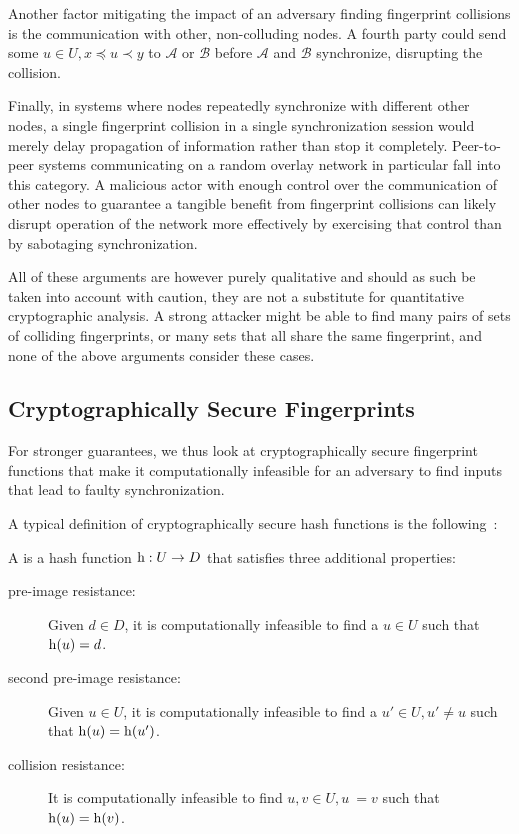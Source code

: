 \documentclass[conference]{IEEEtran}
\begin{document}
Another factor mitigating the impact of an adversary finding fingerprint collisions is the communication with other, non-colluding nodes. A fourth party could send some $u \in U, x \preceq u \prec y$ to $\mathcal{A}$ or $\mathcal{B}$ before $\mathcal{A}$ and $\mathcal{B}$ synchronize, disrupting the collision.

Finally, in systems where nodes repeatedly synchronize with different other nodes, a single fingerprint collision in a single synchronization session would merely delay propagation of information rather than stop it completely. Peer-to-peer systems communicating on a random overlay network in particular fall into this category. A malicious actor with enough control over the communication of other nodes to guarantee a tangible benefit from fingerprint collisions can likely disrupt operation of the network more effectively by exercising that control than by sabotaging synchronization.

All of these arguments are however purely qualitative and should as such be taken into account with caution, they are not a substitute for quantitative cryptographic analysis. A strong attacker might be able to find many pairs of sets of colliding fingerprints, or many sets that all share the same fingerprint, and none of the above arguments consider these cases.

\subsection{Cryptographically Secure Fingerprints}

For stronger guarantees, we thus look at cryptographically secure fingerprint functions that make it computationally infeasible for an adversary to find inputs that lead to faulty synchronization.

A typical definition of cryptographically secure hash functions is the following~\cite{menezes2018handbook}:

\begin{definition}
A  is a hash function ${\operatorname{h}}: {U} \rightarrow {D}$ that satisfies three additional properties:

\begin{description}
  \item[pre-image resistance:] Given $d \in D$, it is computationally infeasible to find a $u \in U$ such that $\operatorname{h}(u) = d$.
  \item[second pre-image resistance:] Given $u \in U$, it is computationally infeasible to find a $u' \in U, u' \neq u$ such that $\operatorname{h}(u) = \operatorname{h}(u')$.
  \item[collision resistance:] It is computationally infeasible to find $u, v \in U, u ~= v$ such that $\operatorname{h}(u) = \operatorname{h}(v)$.
\end{description}
\end{definition}
\end{document}
